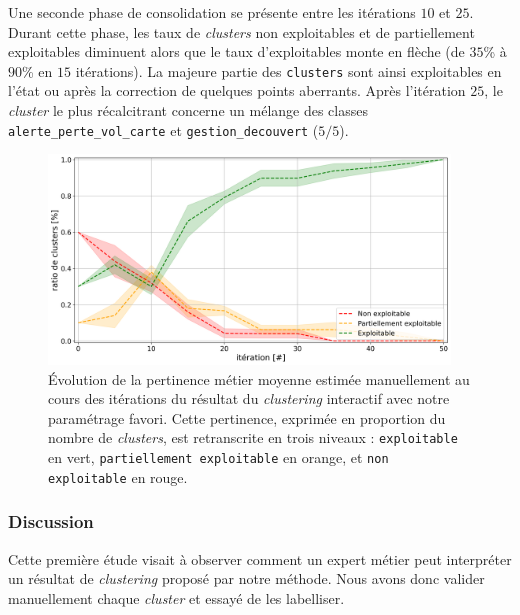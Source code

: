 			Une seconde phase de consolidation se présente entre les itérations $10$ et $25$.
			Durant cette phase, les taux de \textit{clusters} non exploitables et de partiellement exploitables diminuent alors que le taux d'exploitables monte en flèche (de $35$\% à $90$\% en $15$ itérations).
			La majeure partie des \texttt{clusters} sont ainsi exploitables en l'état ou après la correction de quelques points aberrants.
			Après l'itération $25$, le \textit{cluster} le plus récalcitrant concerne un mélange des classes \texttt{alerte\_perte\_vol\_carte} et \texttt{gestion\_decouvert} ($5/5$).

			\begin{figure}[!htb]
				\centering
				\includegraphics[width=0.95\textwidth]{figures/etude-pertinence-llm-check-clustering-annotation-favori}
				\caption{
					Évolution de la pertinence métier moyenne estimée manuellement au cours des itérations du résultat du \textit{clustering} interactif avec notre paramétrage favori.
					Cette pertinence, exprimée en proportion du nombre de \textit{clusters}, est retranscrite en trois niveaux : \texttt{exploitable} en vert, \texttt{partiellement exploitable} en orange, et \texttt{non exploitable} en rouge.
				}
				\label{figure:4.4.1-ETUDE-PERTINENCE-VALIDATION-MANUELLE}
			\end{figure}


		\subsubsection{Discussion}
		
			Cette première étude visait à observer comment un expert métier peut interpréter un résultat de \textit{clustering} proposé par notre méthode.
			Nous avons donc valider manuellement chaque \textit{cluster} et essayé de les labelliser.
			\\
			
